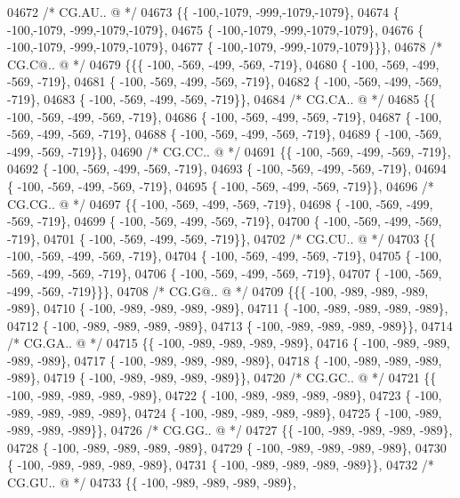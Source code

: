 \begin{DoxyCode}
04672 \textcolor{comment}{/* CG.AU.. @ */}
04673 \{\{ -100,-1079, -999,-1079,-1079\},
04674 \{ -100,-1079, -999,-1079,-1079\},
04675 \{ -100,-1079, -999,-1079,-1079\},
04676 \{ -100,-1079, -999,-1079,-1079\},
04677 \{ -100,-1079, -999,-1079,-1079\}\}\},
04678 \textcolor{comment}{/* CG.C@.. @ */}
04679 \{\{\{ -100, -569, -499, -569, -719\},
04680 \{ -100, -569, -499, -569, -719\},
04681 \{ -100, -569, -499, -569, -719\},
04682 \{ -100, -569, -499, -569, -719\},
04683 \{ -100, -569, -499, -569, -719\}\},
04684 \textcolor{comment}{/* CG.CA.. @ */}
04685 \{\{ -100, -569, -499, -569, -719\},
04686 \{ -100, -569, -499, -569, -719\},
04687 \{ -100, -569, -499, -569, -719\},
04688 \{ -100, -569, -499, -569, -719\},
04689 \{ -100, -569, -499, -569, -719\}\},
04690 \textcolor{comment}{/* CG.CC.. @ */}
04691 \{\{ -100, -569, -499, -569, -719\},
04692 \{ -100, -569, -499, -569, -719\},
04693 \{ -100, -569, -499, -569, -719\},
04694 \{ -100, -569, -499, -569, -719\},
04695 \{ -100, -569, -499, -569, -719\}\},
04696 \textcolor{comment}{/* CG.CG.. @ */}
04697 \{\{ -100, -569, -499, -569, -719\},
04698 \{ -100, -569, -499, -569, -719\},
04699 \{ -100, -569, -499, -569, -719\},
04700 \{ -100, -569, -499, -569, -719\},
04701 \{ -100, -569, -499, -569, -719\}\},
04702 \textcolor{comment}{/* CG.CU.. @ */}
04703 \{\{ -100, -569, -499, -569, -719\},
04704 \{ -100, -569, -499, -569, -719\},
04705 \{ -100, -569, -499, -569, -719\},
04706 \{ -100, -569, -499, -569, -719\},
04707 \{ -100, -569, -499, -569, -719\}\}\},
04708 \textcolor{comment}{/* CG.G@.. @ */}
04709 \{\{\{ -100, -989, -989, -989, -989\},
04710 \{ -100, -989, -989, -989, -989\},
04711 \{ -100, -989, -989, -989, -989\},
04712 \{ -100, -989, -989, -989, -989\},
04713 \{ -100, -989, -989, -989, -989\}\},
04714 \textcolor{comment}{/* CG.GA.. @ */}
04715 \{\{ -100, -989, -989, -989, -989\},
04716 \{ -100, -989, -989, -989, -989\},
04717 \{ -100, -989, -989, -989, -989\},
04718 \{ -100, -989, -989, -989, -989\},
04719 \{ -100, -989, -989, -989, -989\}\},
04720 \textcolor{comment}{/* CG.GC.. @ */}
04721 \{\{ -100, -989, -989, -989, -989\},
04722 \{ -100, -989, -989, -989, -989\},
04723 \{ -100, -989, -989, -989, -989\},
04724 \{ -100, -989, -989, -989, -989\},
04725 \{ -100, -989, -989, -989, -989\}\},
04726 \textcolor{comment}{/* CG.GG.. @ */}
04727 \{\{ -100, -989, -989, -989, -989\},
04728 \{ -100, -989, -989, -989, -989\},
04729 \{ -100, -989, -989, -989, -989\},
04730 \{ -100, -989, -989, -989, -989\},
04731 \{ -100, -989, -989, -989, -989\}\},
04732 \textcolor{comment}{/* CG.GU.. @ */}
04733 \{\{ -100, -989, -989, -989, -989\},

\end{DoxyCode}
